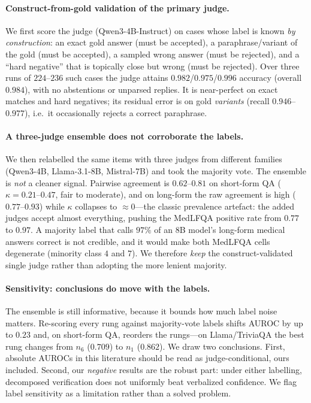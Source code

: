 \documentclass[11pt]{article}
\begin{document}
\paragraph{Construct-from-gold validation of the primary judge.} We first score the judge
(Qwen3-4B-Instruct) on cases whose label is known \emph{by construction}: an exact gold answer
(must be accepted), a paraphrase/variant of the gold (must be accepted), a sampled wrong answer
(must be rejected), and a ``hard negative'' that is topically close but wrong (must be
rejected). Over three runs of $224$--$236$ such cases the judge attains
$0.982$/$0.975$/$0.996$ accuracy (overall $0.984$), with no abstentions or unparsed replies. It
is near-perfect on exact matches and hard negatives; its residual error is on gold
\emph{variants} (recall $0.946$--$0.977$), i.e.\ it occasionally rejects a correct paraphrase.

\paragraph{A three-judge ensemble does not corroborate the labels.} We then relabelled the same
items with three judges from different families (Qwen3-4B, Llama-3.1-8B, Mistral-7B) and took
the majority vote. The ensemble is \emph{not} a cleaner signal. Pairwise agreement is
$0.62$--$0.81$ on short-form QA ($\kappa=0.21$--$0.47$, fair to moderate), and on long-form the
raw agreement is high ($0.77$--$0.93$) while $\kappa$ collapses to $\approx0$---the classic
prevalence artefact: the added judges accept almost everything, pushing the MedLFQA positive
rate from $0.77$ to $0.97$. A majority label that calls $97\%$ of an 8B model's long-form
medical answers correct is not credible, and it would make both MedLFQA cells degenerate
(minority class $4$ and $7$). We therefore \emph{keep} the construct-validated single judge
rather than adopting the more lenient majority.

\paragraph{Sensitivity: conclusions do move with the labels.} The ensemble is still
informative, because it bounds how much label noise matters. Re-scoring every rung against
majority-vote labels shifts AUROC by up to $0.23$ and, on short-form QA, reorders the
rungs---on Llama/TriviaQA the best rung changes from $n_6$ ($0.709$) to $n_1$ ($0.862$). We
draw two conclusions. First, absolute AUROCs in this literature should be read as
judge-conditional, ours included. Second, our \emph{negative} results are the robust part:
under either labelling, decomposed verification does not uniformly beat verbalized confidence.
We flag label sensitivity as a limitation rather than a solved problem.
\end{document}
